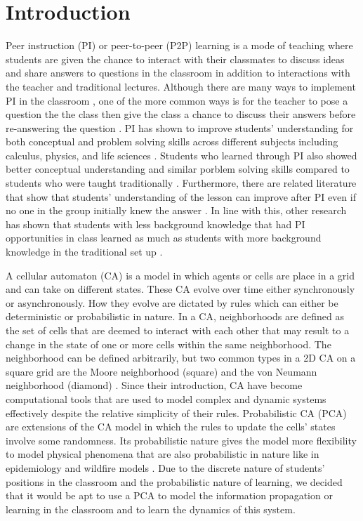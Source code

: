 \documentclass[10pt,a4paper,twoside]{article}
\begin{document}
\section{Introduction}\label{sec:intro}
Peer instruction (PI) or peer-to-peer (P2P) learning is a mode of teaching where students are given the chance to interact with their classmates to discuss ideas and share answers to questions in the classroom in addition to interactions with the teacher and traditional lectures. Although there are many ways to implement PI in the classroom \cite{knight2018peer}, one of the more common ways is for the teacher to pose a question the the class then give the class a chance to discuss their answers before re-answering the question \cite{crouch2001peer}. PI has shown to improve students' understanding for both conceptual and problem solving skills across different subjects including calculus, physics, and life sciences \cite{crouch2001peer,smith2009peer}. Students who learned through PI also showed better conceptual understanding and similar porblem solving skills compared to students who were taught traditionally \cite{lasry2008peer}. Furthermore, there are related literature that show that students' understanding of the lesson can improve after PI even if no one in the group initially knew the answer \cite{smith2009peer}. In line with this, other research has shown that students with less background knowledge that had PI opportunities in class learned as much as students with more background knowledge in the traditional set up \cite{lasry2008peer}.

\noindent A cellular automaton (CA) is a model in which agents or cells are place in a grid and can take on different states. These CA evolve over time either synchronously or asynchronously. How they evolve are dictated by rules which can either be deterministic or probabilistic in nature. In a CA, neighborhoods are defined as the set of cells that are deemed to interact with each other that may result to a change in the state of one or more cells within the same neighborhood. The neighborhood can be defined arbitrarily, but two common types in a 2D CA on a square grid are the Moore neighborhood (square) and the von Neumann neighborhood (diamond) \cite{weisstein2002cellular}. Since their introduction, CA have become computational tools that are used to model complex and dynamic systems effectively despite the relative simplicity of their rules. Probabilistic CA (PCA) are extensions of the CA model in which the rules to update the cells' states involve some randomness. Its probabilistic nature gives the model more flexibility to model physical phenomena that are also probabilistic in nature like in epidemiology and wildfire models \cite{louis2018probabilistic}. Due to the discrete nature of students' positions in the classroom and the probabilistic nature of learning, we decided that it would be apt to use a PCA to model the information propagation or learning in the classroom and to learn the dynamics of this system.
\end{document}
